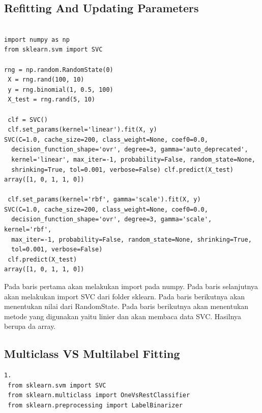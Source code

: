 \begin{enumerate}
\subsection{Refitting And Updating Parameters}

\begin{verbatim}

import numpy as np
from sklearn.svm import SVC

rng = np.random.RandomState(0)
 X = rng.rand(100, 10)
 y = rng.binomial(1, 0.5, 100)
 X_test = rng.rand(5, 10)

 clf = SVC()
 clf.set_params(kernel='linear').fit(X, y)  
SVC(C=1.0, cache_size=200, class_weight=None, coef0=0.0,
  decision_function_shape='ovr', degree=3, gamma='auto_deprecated',
  kernel='linear', max_iter=-1, probability=False, random_state=None,
  shrinking=True, tol=0.001, verbose=False) clf.predict(X_test)
array([1, 0, 1, 1, 0])

 clf.set_params(kernel='rbf', gamma='scale').fit(X, y)  
SVC(C=1.0, cache_size=200, class_weight=None, coef0=0.0,
  decision_function_shape='ovr', degree=3, gamma='scale', kernel='rbf',
  max_iter=-1, probability=False, random_state=None, shrinking=True,
  tol=0.001, verbose=False)
 clf.predict(X_test)
array([1, 0, 1, 1, 0])

\end{verbatim}
\subitem
Pada baris pertama akan melakukan import pada numpy.
Pada baris selanjutnya akan melakukan import SVC dari folder sklearn.
Pada baris berikutnya akan menentukan nilai dari RandomState.
Pada baris berikutnya akan menentukan metode yang digunakan yaitu linier dan akan membaca data SVC.
Hasilnya berupa da array.

\subsection{Multiclass VS Multilabel Fitting}

\begin{verbatim}
1.
 from sklearn.svm import SVC
 from sklearn.multiclass import OneVsRestClassifier
 from sklearn.preprocessing import LabelBinarizer


\end{verbatim}
\end{enumerate}
